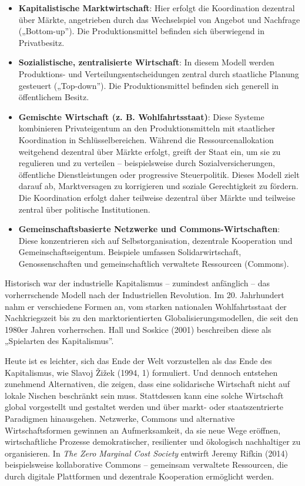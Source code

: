 \documentclass[
  nswissgerman,
  a4paper,
  DIV=11,
  numbers=noendperiod,
  oneside,
  openany]{scrreprt}
\begin{document}
\begin{itemize}
\item
  \textbf{Kapitalistische Marktwirtschaft}: Hier erfolgt die
  Koordination dezentral über Märkte, angetrieben durch das Wechselspiel
  von Angebot und Nachfrage („Bottom-up''). Die Produktionsmittel
  befinden sich überwiegend in Privatbesitz.
\item
  \textbf{Sozialistische, zentralisierte Wirtschaft}: In diesem Modell
  werden Produktions- und Verteilungsentscheidungen zentral durch
  staatliche Planung gesteuert („Top-down''). Die Produktionsmittel
  befinden sich generell in öffentlichem Besitz.
\item
  \textbf{Gemischte Wirtschaft (z. B. Wohlfahrtsstaat)}: Diese Systeme
  kombinieren Privateigentum an den Produktionsmitteln mit staatlicher
  Koordination in Schlüsselbereichen. Während die Ressourcenallokation
  weitgehend dezentral über Märkte erfolgt, greift der Staat ein, um sie
  zu regulieren und zu verteilen -- beispielsweise durch
  Sozialversicherungen, öffentliche Dienstleistungen oder progressive
  Steuerpolitik. Dieses Modell zielt darauf ab, Marktversagen zu
  korrigieren und soziale Gerechtigkeit zu fördern. Die Koordination
  erfolgt daher teilweise dezentral über Märkte und teilweise zentral
  über politische Institutionen.
\item
  \textbf{Gemeinschaftsbasierte Netzwerke und Commons-Wirtschaften}:
  Diese konzentrieren sich auf Selbstorganisation, dezentrale
  Kooperation und Gemeinschaftseigentum. Beispiele umfassen
  Solidarwirtschaft, Genossenschaften und gemeinschaftlich verwaltete
  Ressourcen (Commons).
\end{itemize}

Historisch war der industrielle Kapitalismus -- zumindest anfänglich --
das vorherrschende Modell nach der Industriellen Revolution. Im 20.
Jahrhundert nahm er verschiedene Formen an, vom starken nationalen
Wohlfahrtsstaat der Nachkriegszeit bis zu den marktorientierten
Globalisierungsmodellen, die seit den 1980er Jahren vorherrschen. Hall
und Soskice (2001) beschreiben diese als „Spielarten des Kapitalismus''.

Heute ist es leichter, sich das Ende der Welt vorzustellen als das Ende
des Kapitalismus, wie Slavoj Žižek (1994, 1) formuliert. Und dennoch
entstehen zunehmend Alternativen, die zeigen, dass eine solidarische
Wirtschaft nicht auf lokale Nischen beschränkt sein muss. Stattdessen
kann eine solche Wirtschaft global vorgestellt und gestaltet werden und
über markt- oder staatszentrierte Paradigmen hinausgehen. Netzwerke,
Commons und alternative Wirtschaftsformen gewinnen an Aufmerksamkeit, da
sie neue Wege eröffnen, wirtschaftliche Prozesse demokratischer,
resilienter und ökologisch nachhaltiger zu organisieren. In \emph{The
Zero Marginal Cost Society} entwirft Jeremy Rifkin (2014) beispielsweise
kollaborative Commons -- gemeinsam verwaltete Ressourcen, die durch
digitale Plattformen und dezentrale Kooperation ermöglicht werden.
\end{document}

